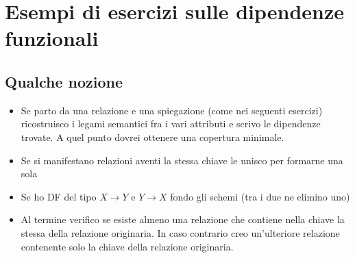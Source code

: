 
\chapter{Esempi di esercizi sulle dipendenze funzionali}
\section{Qualche nozione}
\begin{itemize}
	\item Se parto da una relazione e una spiegazione (come nei seguenti esercizi) ricostruisco i legami semantici fra i vari attributi e scrivo le dipendenze trovate. A quel punto dovrei ottenere una copertura minimale.
	\item Se si manifestano relazioni aventi la stessa chiave le unisco per formarne una sola
	\item Se ho DF del tipo $X \to Y$ e $Y \to X$ fondo gli schemi (tra i due ne elimino uno)
	\item Al termine verifico se esiste almeno una relazione che contiene nella chiave la stessa della relazione originaria. In caso contrario creo un'ulteriore relazione contenente solo la chiave della relazione originaria.
\end{itemize}

